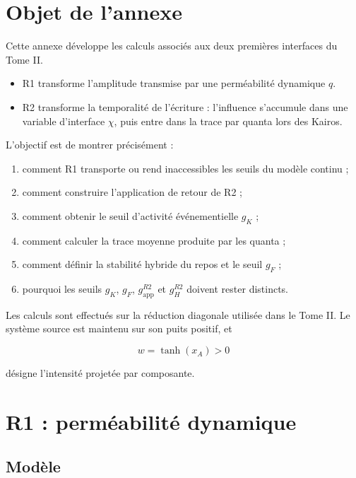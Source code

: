 \section{Objet de l'annexe}
\label{annexe-interfaces-objet}

Cette annexe développe les calculs associés aux deux premières
interfaces du Tome II.

\begin{itemize}
\item
  R1 transforme l'amplitude transmise par une perméabilité dynamique
  \(q\).
\item
  R2 transforme la temporalité de l'écriture : l'influence s'accumule
  dans une variable d'interface \(\chi\), puis entre dans la trace par
  quanta lors des Kairos.
\end{itemize}

L'objectif est de montrer précisément :

\begin{enumerate}
\item
  comment R1 transporte ou rend inaccessibles les seuils du modèle
  continu ;
\item
  comment construire l'application de retour de R2 ;
\item
  comment obtenir le seuil d'activité événementielle \(g_K\) ;
\item
  comment calculer la trace moyenne produite par les quanta ;
\item
  comment définir la stabilité hybride du repos et le seuil \(g_F\) ;
\item
  pourquoi les seuils \(g_K\), \(g_F\),
  \(g_{\mathrm{app}}^{R2}\) et \(g_H^{R2}\) doivent rester distincts.
\end{enumerate}

Les calculs sont effectués sur la réduction diagonale utilisée dans le
Tome II. Le système source est maintenu sur son puits positif, et

\[
w=\tanh(x_A)>0
\]

désigne l'intensité projetée par composante.

\section{R1 : perméabilité dynamique}

\subsection{Modèle}
\label{annexe-r1-modele}

